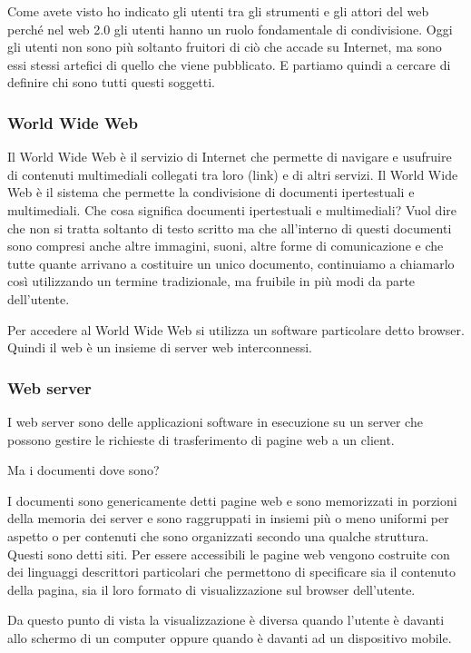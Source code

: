 Come avete visto ho indicato gli utenti tra gli strumenti e gli attori del web perché nel web 2.0 gli utenti hanno un ruolo fondamentale di condivisione. Oggi gli utenti non sono più soltanto fruitori di ciò che accade su Internet, ma sono essi stessi artefici di quello che viene pubblicato. E partiamo quindi a cercare di definire chi sono tutti questi soggetti.

\subsubsection{World Wide Web}

Il  World Wide Web è il servizio di Internet che permette di navigare e usufruire di contenuti multimediali collegati tra loro (link) e di altri servizi. Il World Wide Web è il sistema che permette la condivisione di documenti ipertestuali e multimediali. 
Che cosa significa documenti ipertestuali e multimediali? 
Vuol dire che non si tratta soltanto di testo scritto ma che all'interno di questi documenti sono compresi anche altre immagini, suoni, altre forme di comunicazione e che tutte quante arrivano a costituire un unico documento, continuiamo a chiamarlo così utilizzando un termine tradizionale, ma fruibile in più modi da parte dell'utente.

Per accedere al World Wide Web si utilizza un software particolare detto browser. Quindi il web è un insieme di server web interconnessi.

\subsubsection{Web server}

I web server sono delle applicazioni software in esecuzione su un server che possono gestire le richieste di trasferimento di pagine web a un client. 

Ma i documenti dove sono? 

I documenti sono genericamente detti pagine web e sono memorizzati in porzioni della memoria dei server e sono raggruppati in insiemi più o meno uniformi per aspetto o per contenuti che sono organizzati secondo una qualche struttura. Questi sono detti siti. 
Per essere accessibili le pagine web vengono costruite con dei linguaggi descrittori particolari che permettono di specificare sia il contenuto della pagina, sia il loro formato di visualizzazione sul browser dell'utente.

Da questo punto di vista la visualizzazione è diversa quando l'utente è davanti allo schermo di un computer oppure quando è davanti ad un dispositivo mobile.

